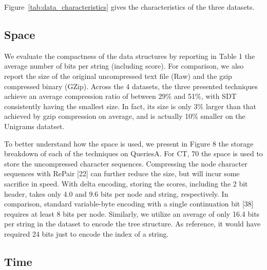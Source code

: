 \documentclass{sig-alternate}
\begin{document}
Figure~\ref{tab:data_characteristics} gives the characteristics of the
three datasets.


\subsection{Space}

We evaluate the compactness of the data structures by
reporting in Table 1 the average number of bits per string
(including score). For comparison, we also report the size
of the original uncompressed text file (Raw) and the gzip
compressed binary (GZip). Across the 4 datasets, the three
presented techniques achieve an average compression ratio
of between 29\% and 51\%, with SDT consistently having the
smallest size. In fact, its size is only 3\% larger than that
achieved by gzip compression on average, and is actually
10\% smaller on the Unigrams datatset.



To better understand how the space is used, we present
in Figure 8 the storage breakdown of each of the techniques
on QueriesA. For CT, 70  the space is used to store the
uncompressed character sequences. Compressing the node
character sequences with RePair [22] can further reduce the
size, but will incur some sacrifice in speed. With delta encoding,
storing the scores, including the 2 bit header, takes
only 4.0 and 9.6 bits per node and string, respectively. In
comparison, standard variable-byte encoding with a single
continuation bit [38] requires at least 8 bits per node. Similarly,
we utilize an average of only 16.4 bits per string in the
dataset to encode the tree structure. As reference, it would
have required 24 bits just to encode the index of a string.

\subsection{Time}
\end{document}
